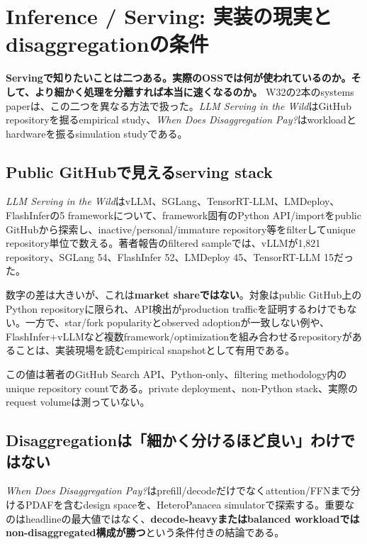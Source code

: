 \section{Inference / Serving: 実装の現実とdisaggregationの条件}

\textbf{Servingで知りたいことは二つある。実際のOSSでは何が使われているのか。そして、より細かく処理を分離すれば本当に速くなるのか。}
W32の2本のsystems paperは、この二つを異なる方法で扱った。\textit{LLM Serving in the Wild}はGitHub repositoryを掘るempirical study、\textit{When Does Disaggregation Pay?}はworkloadとhardwareを振るsimulation studyである\cite{serving-in-the-wild-paper,disaggregation-paper}。

\subsection*{Public GitHubで見えるserving stack}

\textit{LLM Serving in the Wild}はvLLM、SGLang、TensorRT-LLM、LMDeploy、FlashInferの5 frameworkについて、framework固有のPython API/importをpublic GitHubから探索し、inactive/personal/immature repository等をfilterしてunique repository単位で数える。著者報告のfiltered sampleでは、vLLMが1,821 repository、SGLang 54、FlashInfer 52、LMDeploy 45、TensorRT-LLM 15だった\cite{serving-in-the-wild-paper}。

数字の差は大きいが、これは\textbf{market shareではない}。対象はpublic GitHub上のPython repositoryに限られ、API検出がproduction trafficを証明するわけでもない。一方で、star/fork popularityとobserved adoptionが一致しない例や、FlashInfer+vLLMなど複数framework/optimizationを組み合わせるrepositoryがあることは、実装現場を読むempirical snapshotとして有用である。

\begin{claimboundary}
この値は著者のGitHub Search API、Python-only、filtering methodology内のunique repository countである。private deployment、non-Python stack、実際のrequest volumeは測っていない。
\end{claimboundary}

\subsection*{Disaggregationは「細かく分けるほど良い」わけではない}

\textit{When Does Disaggregation Pay?}はprefill/decodeだけでなくattention/FFNまで分けるPDAFを含むdesign spaceを、HeteroPanacea simulatorで探索する。重要なのはheadlineの最大値ではなく、\textbf{decode-heavyまたはbalanced workloadではnon-disaggregated構成が勝つ}という条件付きの結論である\cite{disaggregation-paper}。

